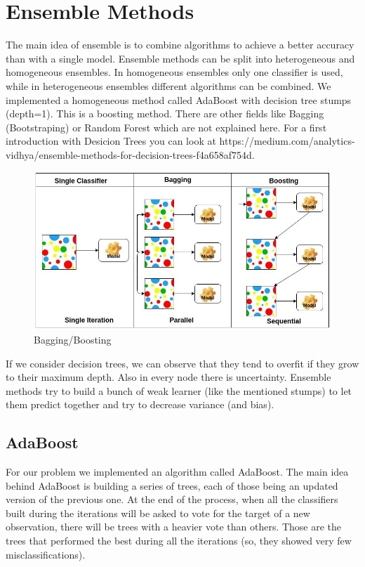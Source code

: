 \section{Ensemble Methods}
The main idea of ensemble is to combine algorithms to achieve a better accuracy than with a single model. Ensemble methods can be split into heterogeneous and homogeneous ensembles. In homogeneous ensembles only one classifier is used, while in heterogeneous ensembles different algorithms can be combined. 
We implemented a homogeneous method called AdaBoost with decision tree stumps (depth=1). This is a boosting method. There are other fields like Bagging (Bootstraping) or Random Forest which are not explained here. For a first introduction with Desicion Trees you can look at https://medium.com/analytics-vidhya/ensemble-methods-for-decision-trees-f4a658af754d.\\
\begin{figure}[hbtp]
	\centering
	\includegraphics[scale=0.5]{ensemble_1}
	\caption{Bagging/Boosting}
	\label{fig:Datensatz - unbearbeitet}
\end{figure}
If we consider decision trees, we can observe that they tend to overfit if they grow to their maximum depth. Also in every node there is uncertainty. Ensemble methods try to build a bunch of weak learner (like the mentioned stumps) to let them predict together and try to decrease variance (and bias).



\subsection{AdaBoost}
For our problem we implemented an algorithm called AdaBoost. The main idea behind AdaBoost is building a series of trees, each of those being an updated version of the previous one. At the end of the process, when all the classifiers built during the iterations will be asked to vote for the target of a new observation, there will be trees with a heavier vote than others. Those are the trees that performed the best during all the iterations (so, they showed very few misclassifications).

